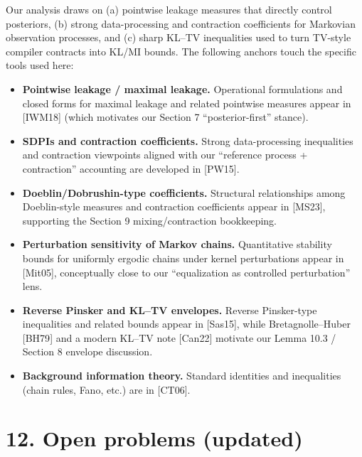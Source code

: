 \documentclass[11pt]{article}
\providecommand{\tightlist}{%
  \setlength{\itemsep}{0pt}\setlength{\parskip}{0pt}}
\begin{document}
Our analysis draws on (a) pointwise leakage measures that directly
control posteriors, (b) strong data-processing and contraction
coefficients for Markovian observation processes, and (c) sharp KL--TV
inequalities used to turn TV-style compiler contracts into KL/MI bounds.
The following anchors touch the specific tools used here:

\begin{itemize}
\tightlist
\item
  \textbf{Pointwise leakage / maximal leakage.} Operational formulations
  and closed forms for maximal leakage and related pointwise measures
  appear in {[}IWM18{]} (which motivates our Section 7
  ``posterior-first'' stance).
\item
  \textbf{SDPIs and contraction coefficients.} Strong data-processing
  inequalities and contraction viewpoints aligned with our ``reference
  process + contraction'' accounting are developed in {[}PW15{]}.
\item
  \textbf{Doeblin/Dobrushin-type coefficients.} Structural relationships
  among Doeblin-style measures and contraction coefficients appear in
  {[}MS23{]}, supporting the Section 9 mixing/contraction bookkeeping.
\item
  \textbf{Perturbation sensitivity of Markov chains.} Quantitative
  stability bounds for uniformly ergodic chains under kernel
  perturbations appear in {[}Mit05{]}, conceptually close to our
  ``equalization as controlled perturbation'' lens.
\item
  \textbf{Reverse Pinsker and KL--TV envelopes.} Reverse Pinsker-type
  inequalities and related bounds appear in {[}Sas15{]}, while
  Bretagnolle--Huber {[}BH79{]} and a modern KL--TV note {[}Can22{]}
  motivate our Lemma 10.3 / Section 8 envelope discussion.
\item
  \textbf{Background information theory.} Standard identities and
  inequalities (chain rules, Fano, etc.) are in {[}CT06{]}.
\end{itemize}

\hypertarget{open-problems-updated}{%
\section{12. Open problems (updated)}\label{open-problems-updated}}
\end{document}
